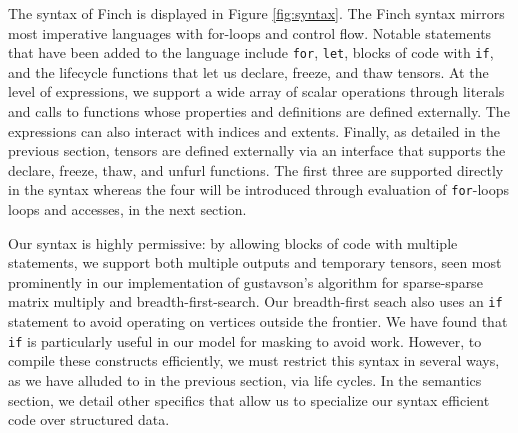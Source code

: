 The syntax of Finch is displayed in Figure \ref{fig:syntax}. The Finch syntax
mirrors most imperative languages with for-loops and control flow. Notable
statements that have been added to the language include \texttt{for},
\texttt{let}, blocks of code with \texttt{if}, and 
the lifecycle functions that let us declare, freeze, and thaw tensors.
%
At the level of expressions, we support a wide array of scalar operations through literals and calls to functions whose properties and definitions are defined externally.
%
The expressions can also interact with indices and extents.
Finally, as detailed in the previous section, tensors are defined externally via an interface that supports the declare, freeze, thaw, and unfurl functions.
%
The first three are supported directly in the syntax whereas the four will be introduced through evaluation of \texttt{for}-loops loops and accesses,
in the next section.
%

Our syntax is highly permissive: by allowing blocks of code with multiple statements, we support both multiple outputs and temporary tensors, seen most prominently in our implementation of gustavson's algorithm for sparse-sparse matrix multiply and breadth-first-search.
%
Our breadth-first seach also uses an
\texttt{if} statement to avoid operating on vertices outside the
frontier. 
%
We have found that \texttt{if} is particularly useful in
our model for masking to avoid work.
%
However, to compile these constructs efficiently, we must restrict this syntax in several ways, as we have alluded to in the previous section, via life cycles.
%
In the semantics section, we detail other specifics that allow us to specialize our syntax efficient code over structured data.




